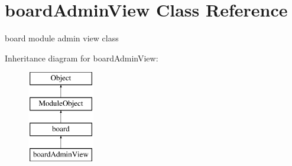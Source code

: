 \hypertarget{classboardAdminView}{}\section{board\+Admin\+View Class Reference}
\label{classboardAdminView}


board module admin view class  


Inheritance diagram for board\+Admin\+View\+:\begin{figure}[H]
\begin{center}
\leavevmode
\includegraphics[height=4.000000cm]{classboardAdminView}
\end{center}
\end{figure}
